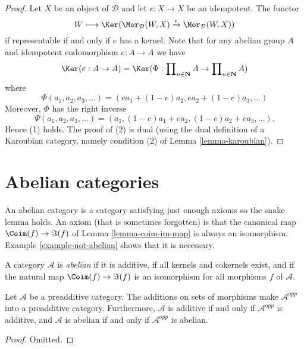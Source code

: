 \begin{proof}
Let $X$ be an object of $\mathcal{D}$ and let $e : X \to X$ be an idempotent.
The functor
$$
W \longmapsto \Ker(
\Mor_\mathcal{D}(W, X)
\xrightarrow{e}
\Mor_\mathcal{D}(W, X)
)
$$
if representable if and only if $e$ has a kernel. Note that for any
abelian group $A$ and idempotent endomorphism $e : A \to A$ we have
$$
\Ker(e : A \to A)
= \Ker(\Phi :
\prod\nolimits_{n \in \mathbf{N}} A
\to
\prod\nolimits_{n \in \mathbf{N}} A
)
$$
where
$$
\Phi(a_1, a_2, a_3, \ldots) = (ea_1 + (1 - e)a_2, ea_2 + (1 - e)a_3, \ldots)
$$
Moreover, $\Phi$ has the right inverse
$$
\Psi(a_1, a_2, a_3, \ldots) =
(a_1, (1 - e)a_1 + ea_2, (1 - e)a_2 + ea_3, \ldots).
$$
Hence (1) holds. The proof of (2) is dual (using the dual definition
of a Karoubian category, namely condition (2) of
Lemma \ref{lemma-karoubian}).
\end{proof}









\section{Abelian categories}
\label{section-abelian-categories}

\noindent
An abelian category is a category satisfying just enough axioms so the
snake lemma holds. An axiom (that is sometimes forgotten)
is that the canonical map $\Coim(f) \to \Im(f)$
of Lemma \ref{lemma-coim-im-map} is always an isomorphism.
Example \ref{example-not-abelian} shows that it is necessary.

\begin{definition}
\label{definition-abelian-category}
A category $\mathcal{A}$ is {\it abelian} if
it is additive, if all kernels and cokernels exist,
and if the natural map $\Coim(f) \to \Im(f)$
is an isomorphism for all morphisms $f$ of
$\mathcal{A}$.
\end{definition}

\begin{lemma}
\label{lemma-abelian-opposite}
Let $\mathcal{A}$ be a preadditive category.
The additions on sets of morphisms make
$\mathcal{A}^{opp}$ into a preadditive category.
Furthermore, $\mathcal{A}$ is additive if and only if $\mathcal{A}^{opp}$
is additive, and
$\mathcal{A}$ is abelian if and only if $\mathcal{A}^{opp}$ is abelian.
\end{lemma}

\begin{proof}
Omitted.
\end{proof}


